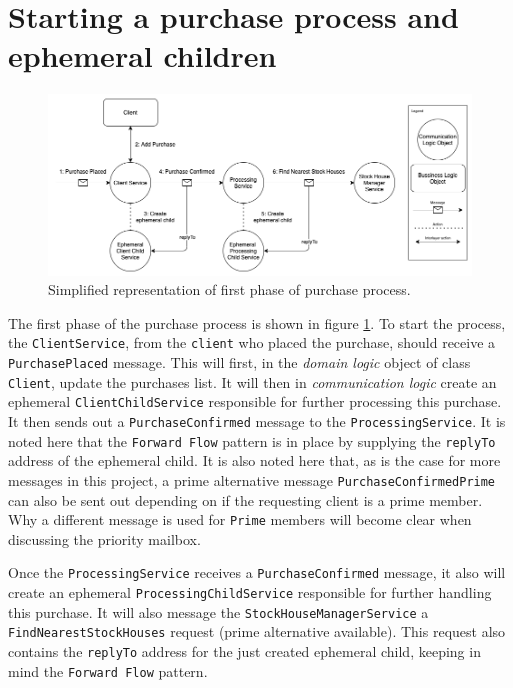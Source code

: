 
\section{Starting a purchase process and ephemeral children}
\label{sec:start_process}

\begin{figure}[H]
    \centering
    \includegraphics[width=0.9\linewidth]{images/initial_phase.png}
    \captionsetup{width=0.75\linewidth}
    \captionsetup{justification=centering}
    \caption{Simplified representation of first phase of purchase process.}
    \label{fig:first-phase}
\end{figure}

The first phase of the purchase process is shown in figure \ref{fig:first-phase}.
To start the process, the \texttt{ClientService}, from the \texttt{client} who placed the purchase, should receive a \texttt{PurchasePlaced} message.
This will first, in the \textit{domain logic} object of class \texttt{Client}, update the purchases list. 
It will then in \textit{communication logic} create an ephemeral \texttt{ClientChildService} responsible for further processing this purchase.
It then sends out a \texttt{Purchase\-Confirmed} message to the \texttt{ProcessingService}.
It is noted here that the \texttt{Forward Flow} pattern is in place by supplying the \texttt{replyTo} address of the ephemeral child.
It is also noted here that, as is the case for more messages in this project, a prime alternative message \texttt{PurchaseConfirmedPrime} can also be sent out depending on if the requesting client is a prime member.
Why a different message is used for \texttt{Prime} members will become clear when discussing the priority mailbox.

Once the \texttt{ProcessingService} receives a \texttt{PurchaseConfirmed} message, it also will create an ephemeral \texttt{ProcessingChildService} responsible for further handling this purchase.
It will also message the \texttt{StockHouseManagerService} a \texttt{FindNearestStockHouses} request (prime alternative available).
This request also contains the \texttt{replyTo} address for the just created ephemeral child, keeping in mind the \texttt{Forward Flow} pattern.

